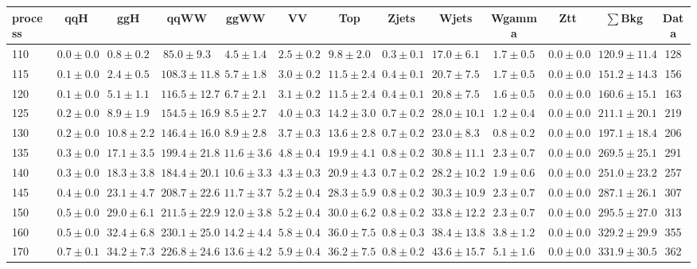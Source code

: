 \begin{table}
{%
 \tiny
 \begin{center}
 \begin{tabular}{l | c c | c c c c c c c c  | c c}
 \hline
 process & qqH & ggH & qqWW & ggWW & VV & Top & Zjets & Wjets & Wgamma & Ztt & $\sum$Bkg & Data \\
 \hline
110 & $0.0\pm0.0$ & $0.8\pm0.2$ & $85.0\pm9.3$ & $4.5\pm1.4$ & $2.5\pm0.2$ & $9.8\pm2.0$ & $0.3\pm0.1$ & $17.0\pm6.1$ & $1.7\pm0.5$ & $0.0\pm0.0$ & $120.9\pm11.4$ & 128 \\
115 & $0.1\pm0.0$ & $2.4\pm0.5$ & $108.3\pm11.8$ & $5.7\pm1.8$ & $3.0\pm0.2$ & $11.5\pm2.4$ & $0.4\pm0.1$ & $20.7\pm7.5$ & $1.7\pm0.5$ & $0.0\pm0.0$ & $151.2\pm14.3$ & 156 \\
120 & $0.1\pm0.0$ & $5.1\pm1.1$ & $116.5\pm12.7$ & $6.7\pm2.1$ & $3.1\pm0.2$ & $11.5\pm2.4$ & $0.4\pm0.1$ & $20.8\pm7.5$ & $1.6\pm0.5$ & $0.0\pm0.0$ & $160.6\pm15.1$ & 163 \\
125 & $0.2\pm0.0$ & $8.9\pm1.9$ & $154.5\pm16.9$ & $8.5\pm2.7$ & $4.0\pm0.3$ & $14.2\pm3.0$ & $0.7\pm0.2$ & $28.0\pm10.1$ & $1.2\pm0.4$ & $0.0\pm0.0$ & $211.1\pm20.1$ & 219 \\
130 & $0.2\pm0.0$ & $10.8\pm2.2$ & $146.4\pm16.0$ & $8.9\pm2.8$ & $3.7\pm0.3$ & $13.6\pm2.8$ & $0.7\pm0.2$ & $23.0\pm8.3$ & $0.8\pm0.2$ & $0.0\pm0.0$ & $197.1\pm18.4$ & 206 \\
135 & $0.3\pm0.0$ & $17.1\pm3.5$ & $199.4\pm21.8$ & $11.6\pm3.6$ & $4.8\pm0.4$ & $19.9\pm4.1$ & $0.8\pm0.2$ & $30.8\pm11.1$ & $2.3\pm0.7$ & $0.0\pm0.0$ & $269.5\pm25.1$ & 291 \\
140 & $0.3\pm0.0$ & $18.3\pm3.8$ & $184.4\pm20.1$ & $10.6\pm3.3$ & $4.3\pm0.3$ & $20.9\pm4.3$ & $0.7\pm0.2$ & $28.2\pm10.2$ & $1.9\pm0.6$ & $0.0\pm0.0$ & $251.0\pm23.2$ & 257 \\
145 & $0.4\pm0.0$ & $23.1\pm4.7$ & $208.7\pm22.6$ & $11.7\pm3.7$ & $5.2\pm0.4$ & $28.3\pm5.9$ & $0.8\pm0.2$ & $30.3\pm10.9$ & $2.3\pm0.7$ & $0.0\pm0.0$ & $287.1\pm26.1$ & 307 \\
150 & $0.5\pm0.0$ & $29.0\pm6.1$ & $211.5\pm22.9$ & $12.0\pm3.8$ & $5.2\pm0.4$ & $30.0\pm6.2$ & $0.8\pm0.2$ & $33.8\pm12.2$ & $2.3\pm0.7$ & $0.0\pm0.0$ & $295.5\pm27.0$ & 313 \\
160 & $0.5\pm0.0$ & $32.4\pm6.8$ & $230.1\pm25.0$ & $14.2\pm4.4$ & $5.8\pm0.4$ & $36.0\pm7.5$ & $0.8\pm0.3$ & $38.4\pm13.8$ & $3.8\pm1.2$ & $0.0\pm0.0$ & $329.2\pm29.9$ & 355 \\
170 & $0.7\pm0.1$ & $34.2\pm7.3$ & $226.8\pm24.6$ & $13.6\pm4.2$ & $5.9\pm0.4$ & $36.2\pm7.5$ & $0.8\pm0.2$ & $43.6\pm15.7$ & $5.1\pm1.6$ & $0.0\pm0.0$ & $331.9\pm30.5$ & 362 \\

\end{tabular}
\end{center}}
\end{table}
